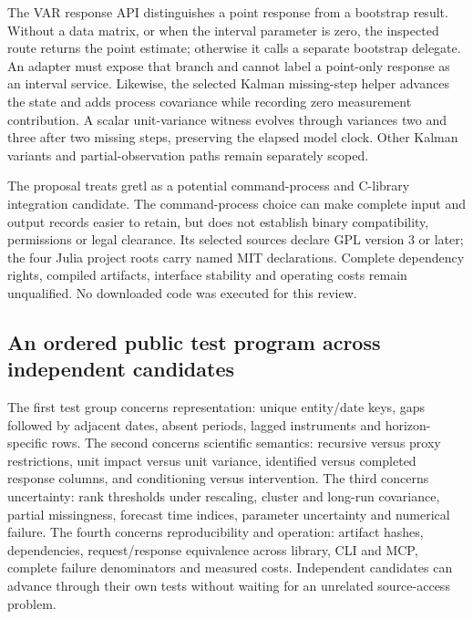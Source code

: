 The VAR response API distinguishes a point response from a bootstrap result. Without a data matrix, or when the interval parameter is zero, the inspected route returns the point estimate; otherwise it calls a separate bootstrap delegate. An adapter must expose that branch and cannot label a point-only response as an interval service. Likewise, the selected Kalman missing-step helper advances the state and adds process covariance while recording zero measurement contribution. A scalar unit-variance witness evolves through variances two and three after two missing steps, preserving the elapsed model clock. Other Kalman variants and partial-observation paths remain separately scoped.~\citep{exec25_odyn_gretl,exec25_odyn_choice}

The proposal treats gretl as a potential command-process and C-library integration candidate. The command-process choice can make complete input and output records easier to retain, but does not establish binary compatibility, permissions or legal clearance. Its selected sources declare GPL version 3 or later; the four Julia project roots carry named MIT declarations. Complete dependency rights, compiled artifacts, interface stability and operating costs remain unqualified. No downloaded code was executed for this review.~\citep{exec25_odyn_gretl,exec25_odyn_dpm,exec25_odyn_lp,exec25_odyn_macro,exec25_odyn_ssm}

\subsection{An ordered public test program across independent candidates}

The first test group concerns representation: unique entity/date keys, gaps followed by adjacent dates, absent periods, lagged instruments and horizon-specific rows. The second concerns scientific semantics: recursive versus proxy restrictions, unit impact versus unit variance, identified versus completed response columns, and conditioning versus intervention. The third concerns uncertainty: rank thresholds under rescaling, cluster and long-run covariance, partial missingness, forecast time indices, parameter uncertainty and numerical failure. The fourth concerns reproducibility and operation: artifact hashes, dependencies, request/response equivalence across library, CLI and MCP, complete failure denominators and measured costs. Independent candidates can advance through their own tests without waiting for an unrelated source-access problem.~\citep{exec25_odyn_choice}

